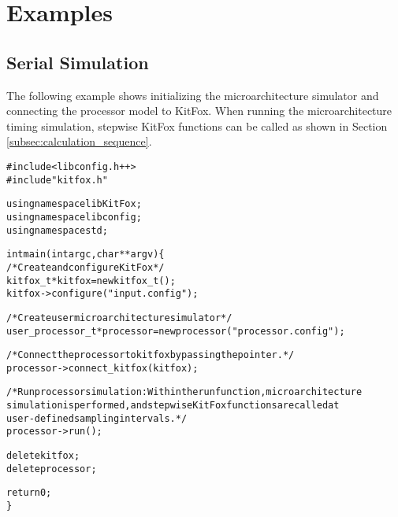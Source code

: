 \section{Examples} \label{sec:examples}
\subsection{Serial Simulation} \label{subsec:serial_simulation}
\noindent
The following example shows initializing the microarchitecture simulator and connecting the processor model to KitFox. 
When running the microarchitecture timing simulation, stepwise KitFox functions can be called as shown in Section \ref{subsec:calculation_sequence}.
{
\fontsize{10pt}{11pt}\selectfont
\begin{alltt}
#include <libconfig.h++>
#include "kitfox.h"

using namespace libKitFox;
using namespace libconfig;
using namespace std;

int main(int argc, char** argv) \{
    /* Create and configure KitFox */
    kitfox_t *kitfox = new kitfox_t();
    kitfox->configure("input.config");
    
    /* Create user microarchitecture simulator */
    user_processor_t *processor = new processor("processor.config");
    
    /* Connect the processor to kitfox by passing the pointer. */
    processor->connect_kitfox(kitfox);
    
    /* Run processor simulation: Within the run function, microarchitecture 
    simulation is performed, and stepwise KitFox functions are called at 
    user-defined sampling intervals. */
    processor->run();
    
    delete kitfox; 
    delete processor;

    return 0;
\}
\end{alltt}
}


